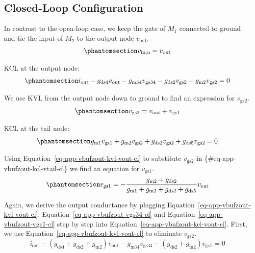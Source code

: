 \documentclass[
  a4paper,
  DIV=11,
  numbers=noendperiod]{scrartcl}
\begin{document}
\subsection{Closed-Loop Configuration}\label{closed-loop-configuration}

In contrast to the open-loop case, we keep the gate of \(M_1\) connected
to ground and tie the input of \(M_2\) to the output node
\(v_\mathrm{out}\).
\begin{equation}\phantomsection\label{eq-app-vbufzout-vin-cl}{
v_\mathrm{in,n} = v_\mathrm{out}
}\end{equation}

KCL at the output node:
\begin{equation}\phantomsection\label{eq-app-vbufzout-kcl-vout-cl}{
i_\mathrm{out} -g_\mathrm{ds4} v_\mathrm{out} - g_\mathrm{m34}v_\mathrm{gs34} - g_\mathrm{ds2}v_\mathrm{gs2} - g_\mathrm{m2}v_\mathrm{gs2} = 0
}\end{equation}

We use KVL from the output node down to ground to find an expression for
\(v_\mathrm{gs2}\).
\begin{equation}\phantomsection\label{eq-app-vbufzout-kvl-vout-cl}{
v_\mathrm{gs2} =  v_\mathrm{out} + v_\mathrm{gs1}
}\end{equation}

KCL at the tail node:
\begin{equation}\phantomsection\label{eq-app-vbufzout-kcl-vtail-cl}{
g_\mathrm{m1}v_\mathrm{gs1} + g_\mathrm{m2}v_\mathrm{gs2} + g_\mathrm{ds2}v_\mathrm{gs2} + g_\mathrm{ds5}v_\mathrm{gs2} = 0
}\end{equation}

Using Equation~\ref{eq-app-vbufzout-kvl-vout-cl} to substitute
\(v_\mathrm{gs2}\) in \{\#eq-app-vbufzout-kcl-vtail-cl\} we find an
equation for \(v_\mathrm{gs1}\).
\begin{equation}\phantomsection\label{eq-app-vbufzout-vgs1-cl}{
v_\mathrm{gs1} = -\frac{g_\mathrm{m2}+g_\mathrm{ds2}}{g_\mathrm{m1}+g_\mathrm{m2}+g_\mathrm{ds2}+g_\mathrm{ds5}}v_\mathrm{out}
}\end{equation}

Again, we derive the output conductance by plugging
Equation~\ref{eq-app-vbufzout-kvl-vout-cl},
Equation~\ref{eq-app-vbufzout-vgs34-ol} and
Equation~\ref{eq-app-vbufzout-vgs1-cl} step by step into
Equation~\ref{eq-app-vbufzout-kcl-vout-cl}. First, we use
Equation~\ref{eq-app-vbufzout-kvl-vout-cl} to eliminate
\(v_\mathrm{gs2}\). \[
i_\mathrm{out} -\left(g_\mathrm{ds4} + g_\mathrm{ds2} + g_\mathrm{m2}\right)v_\mathrm{out} - g_\mathrm{m34}v_\mathrm{gs34} - \left(g_\mathrm{ds2} + g_\mathrm{m2}\right)v_\mathrm{gs1} = 0
\]
\end{document}
